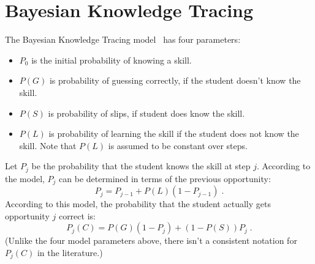 \documentclass[11pt,letterpaper]{article}
\begin{document}


\section{Bayesian Knowledge Tracing}

The Bayesian Knowledge Tracing model~\cite{corbett_knowledge_1994} has four parameters:
%
\begin{itemize}
   \item $P_0$ is the initial probability of knowing a skill.
   \item $P(G)$ is probability of guessing correctly, if the student        
         doesn't know the skill.
   \item $P(S)$ is probability of slips, if student does know the skill.
   \item $P(L)$ is probability of learning the skill if the student 
         does not know the skill.  Note that $P(L)$ is assumed to 
         be constant over steps.
\end{itemize}
%
Let $P_j$ be the probability that the student knows the skill at 
step $j$. According to the model,  $P_j$ can
be determined in terms of the previous opportunity:
%
\begin{equation}
          P_j = P_{j-1} + P(L)\left(1-P_{j-1}\right)  \; . \label{recurse}
\end{equation}
%
According to this model, the probability that the student actually gets
opportunity $j$ correct is:
%
\begin{equation}
         P_j(C) = P(G)\left(1-P_j\right) + \left(1-P(S)\right) P_j \; . \label{pnc}
\end{equation}
%
(Unlike the four model parameters above, there isn't a consistent
notation for $P_j(C)$ in the literature.)
\end{document}

